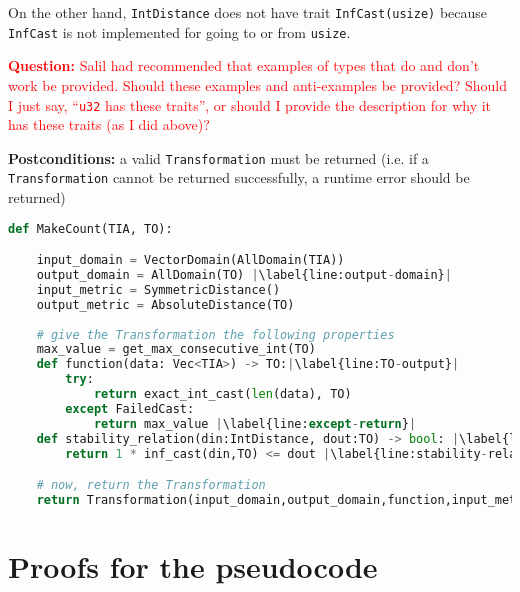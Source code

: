 \documentclass[12pt,letterpaper]{article}
\newcommand{\question}[1]{\textcolor{red}{\textbf{Question:} #1}}
\theoremstyle{definition}
\begin{document}
\begin{itemize}
\begin{itemize}
        On the other hand, \texttt{IntDistance} does not have trait \texttt{InfCast(usize)} because \texttt{InfCast} is not implemented for going to or from \texttt{usize}.
        
    \end{itemize}
    
    \question{Salil had recommended that examples of types that do and don't work be provided. Should these examples and anti-examples be provided? Should I just say, ``\texttt{u32} has these traits'', or should I provide the description for why it has these traits (as I did above)?}
\end{itemize}

\textbf{Postconditions:} a valid \texttt{Transformation} must be returned (i.e. if a \texttt{Transformation} cannot be returned successfully, a runtime error should be returned)

\begin{lstlisting}[language = Python, escapechar=|]
def MakeCount(TIA, TO):

    input_domain = VectorDomain(AllDomain(TIA))
    output_domain = AllDomain(TO) |\label{line:output-domain}|
    input_metric = SymmetricDistance()
    output_metric = AbsoluteDistance(TO)
    
    # give the Transformation the following properties
    max_value = get_max_consecutive_int(TO) 
    def function(data: Vec<TIA>) -> TO:|\label{line:TO-output}|
        try:
            return exact_int_cast(len(data), TO)
        except FailedCast:
            return max_value |\label{line:except-return}|
    def stability_relation(din:IntDistance, dout:TO) -> bool: |\label{line:din-dout-type}|
        return 1 * inf_cast(din,TO) <= dout |\label{line:stability-relation}|

    # now, return the Transformation
    return Transformation(input_domain,output_domain,function,input_metric,output_metric,stability_relation)

\end{lstlisting}

\section{Proofs for the pseudocode}
\end{document}
